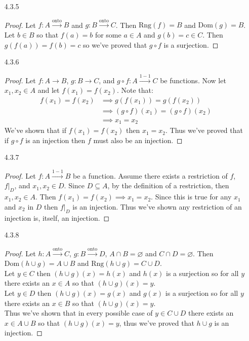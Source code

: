 \documentclass[11pt]{amsart}
\theoremstyle{definition}
\begin{document}
\begin{itemize}
\begin{itemize}
\end{itemize}

\item[4.3.5] \begin{proof}
		Let $f:A\xrightarrow{\text{onto}} B$ and $g:B\xrightarrow{\text{onto}} C$. Then $\text{Rng}(f)=B$ and $\text{Dom}(g)=B$. Let $b\in B$ so that $f(a)=b$ for some $a\in A$ and $g(b)=c\in C$. Then $g(f(a))=f(b)=c$ so we've proved that $g\circ f$ is a surjection.
\end{proof}

\item[4.3.6] \begin{proof}
	Let $f:A\to B$, $g:B\to C$, and $g\circ f:A\xrightarrow{1-1} C$ be functions. Now let $x_1,x_2\in A$ and let $f(x_1)=f(x_2)$. Note that:
	\begin{align*}
		f(x_1)=f(x_2)
		&\implies g(f(x_1))=g(f(x_2)) \\
		&\implies (g\circ f)(x_1)=(g\circ f)(x_2)\\
		&\implies x_1=x_2
	\end{align*}
	We've shown that if $f(x_1)=f(x_2)$ then $x_1=x_2$. Thus we've proved that if $g\circ f$ is an injection then $f$ must also be an injection.
\end{proof}

\item[4.3.7] \begin{proof}
	Let $f:A\xrightarrow{1-1} B$ be a function. Assume there exists a restriction of $f$, $f|_D$, and $x_1,x_2\in D$. Since $D\subseteq A$, by the definition of a restriction, then $x_1,x_2\in A$. Then $f(x_1)=f(x_2)\implies x_1=x_2$. Since this is true for any $x_1$ and $x_2$ in $D$ then $f|_D$ is an injection. Thus we've shown any restriction of an injection is, itself, an injection. 
\end{proof}

\item[4.3.8] \begin{proof}
		Let $h:A\xrightarrow{\text{onto}}C$, $g:B\xrightarrow{\text{onto}} D$, $A\cap B=\varnothing$ and $C\cap D=\varnothing$. Then $\text{Dom}(h\cup g)=A\cup B$ and $\text{Rng}(h\cup g)=C\cup D$. \\
		Let $y\in C$ then $(h\cup g)(x)=h(x)$ and $h(x)$ is a surjection so for all $y$ there exists an $x\in A$ so that $(h\cup g)(x)=y$. \\
		Let $y\in D$ then $(h\cup g)(x)=g(x)$ and $g(x)$ is a surjection so for all $y$ there exists an $x\in B$ so that $(h\cup g)(x)=y$. \\
		Thus we've shown that in every possible case of $y\in C\cup D$ there exists an $x\in A\cup B$ so that $(h\cup g)(x)=y$, thus we've proved that $h\cup g$ is an injection.
\end{proof}

\end{itemize}
\end{document}
